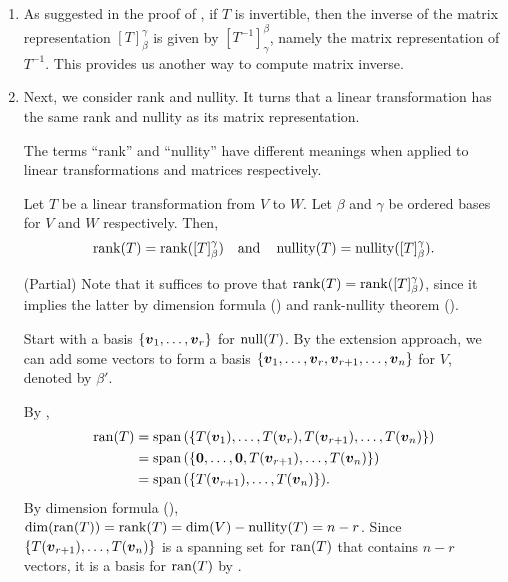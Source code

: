 \begin{enumerate}
\item \label{it:matx-inv-by-inv-lt} As suggested in the proof of
, if \(T\) is invertible, then the inverse of the
matrix representation \([T]_{\beta}^{\gamma}\) is given by
\([T^{-1}]_{\gamma}^{\beta}\), namely the matrix representation of \(T^{-1}\).
This provides us another way to compute matrix inverse.

\item Next, we consider rank and nullity. It turns that a linear transformation
has the same rank and nullity as its matrix representation. \begin{note}
The terms ``rank'' and ``nullity'' have different meanings when applied to
linear transformations and matrices respectively.
\end{note}
\begin{theorem}
\label{thm:lt-matx-rep-same-rank-nul}
Let \(T\) be a linear transformation from \(V\) to \(W\). Let \(\beta\) and
\(\gamma\) be ordered bases for \(V\) and \(W\) respectively. Then,
\[
\rk{T}=\rk{[T]_{\beta}^{\gamma}}
\qqtext{and}
\nulty{T}=\nulty{[T]_{\beta}^{\gamma}}.
\]
\end{theorem}
\begin{pf}
(Partial) Note that it suffices to prove that
\(\operatorname{rank}(T)=\operatorname{rank}([T]_{\beta}^{\gamma})\), since it implies the latter by dimension
formula () and rank-nullity theorem
().

Start with a basis \(\{\vb*{v}_1,\dotsc,\vb*{v}_r\}\) for \(\operatorname{null}(T)\). By the
extension approach, we can add some vectors to form a basis
\(\{\vb*{v}_1,\dotsc,\vb*{v}_r,\vb*{v}_{r+1},\dotsc,\vb*{v}_n\}\) for
\(V\), denoted by \(\beta'\).

By ,
\begin{align*}
\operatorname{ran}(T)&=\operatorname{span}\qty(\{T(\vb*{v}_1),\dotsc,T(\vb*{v}_r),T(\vb*{v}_{r+1}),\dotsc,T(\vb*{v}_n)\}) \\
&=\operatorname{span}\qty(\{\vb*{0},\dotsc,\vb*{0},T(\vb*{v}_{r+1}),\dotsc,T(\vb*{v}_n)\}) \\
&=\operatorname{span}\qty(\{T(\vb*{v}_{r+1}),\dotsc,T(\vb*{v}_n)\}).
\end{align*}
By dimension formula (), \(\dim(\operatorname{ran}(T))=\operatorname{rank}(T)=\dim
(V)-\operatorname{nullity}(T)=n-r\). Since\\ \(\{T(\vb*{v}_{r+1}),\dotsc,T(\vb*{v}_n)\}\) is a
spanning set for \(\operatorname{ran}(T)\) that contains \(n-r\) vectors, it is a basis for
\(\operatorname{ran}(T)\) by .


\end{pf}
\end{enumerate}
